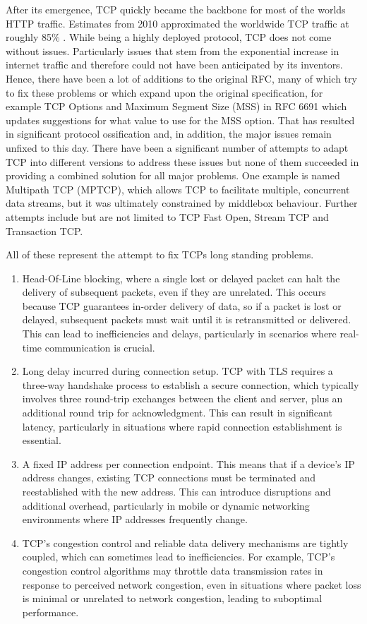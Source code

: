After its emergence, TCP quickly became the backbone for most of the worlds HTTP traffic. Estimates from 2010 approximated the
worldwide TCP traffic at roughly 85\% \cite{tcp-adoption}. While being a highly deployed protocol, TCP does not come without issues.
Particularly issues that stem from the exponential increase in internet traffic and therefore could not have been anticipated by
its inventors. Hence, there have been a lot of additions to the original RFC, many of which try to fix these problems or which
expand upon the original specification, for example TCP Options and Maximum Segment Size (MSS) in RFC 6691\cite[]{rfc6691} which
updates suggestions for what value to use for the MSS option. That has resulted in significant protocol ossification and, in
addition, the major issues remain unfixed to this day. There have been a significant number of attempts to adapt TCP into different
versions to address these issues but none of them succeeded in providing a combined solution for all major problems. One example is
named Multipath TCP (MPTCP), which allows TCP to facilitate multiple, concurrent data streams, but it was ultimately constrained
by middlebox behaviour. Further attempts include but are not limited to TCP Fast Open, Stream TCP and Transaction TCP.

All of these represent the attempt to fix TCPs long standing problems.
\begin{enumerate}
 \item Head-Of-Line blocking, where a single lost or delayed packet can halt the delivery of subsequent packets, even if they are
 unrelated. This occurs because TCP guarantees in-order delivery of data, so if a packet is lost or delayed, subsequent packets
 must wait until it is retransmitted or delivered. This can lead to inefficiencies and delays, particularly in scenarios where
 real-time communication is crucial.
 \item Long delay incurred during connection setup. TCP with TLS requires a three-way handshake process to establish a secure connection, which
 typically involves three round-trip exchanges between the client and server, plus an additional round trip for acknowledgment.
 This can result in significant latency, particularly in situations where rapid connection establishment is essential.
 \item A fixed IP address per connection endpoint. This means that if a device's IP address changes, existing TCP connections must
 be terminated and reestablished with the new address. This can introduce disruptions and additional overhead, particularly in
 mobile or dynamic networking environments where IP addresses frequently change.
 \item TCP's congestion control and reliable data delivery mechanisms are tightly coupled, which can sometimes lead to
 inefficiencies. For example, TCP's congestion control algorithms may throttle data transmission rates in response to perceived
 network congestion, even in situations where packet loss is minimal or unrelated to network congestion, leading to suboptimal
 performance.
\end{enumerate}

